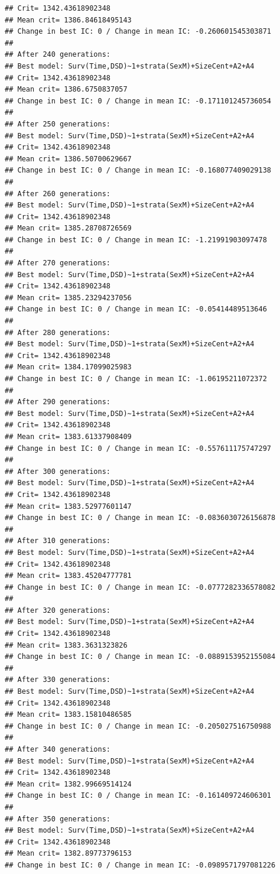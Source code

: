 \documentclass{article}\usepackage[]{graphicx}\usepackage[]{color}
\makeatletter
\newenvironment{kframe}{%
 \def\at@end@of@kframe{}%
 \ifinner\ifhmode%
  \def\at@end@of@kframe{\end{minipage}}%
  \begin{minipage}{\columnwidth}%
 \fi\fi%
 \def\FrameCommand##1{\hskip\@totalleftmargin \hskip-\fboxsep
 \colorbox{shadecolor}{##1}\hskip-\fboxsep
     \hskip-\linewidth \hskip-\@totalleftmargin \hskip\columnwidth}%
 \MakeFramed {\advance\hsize-\width
   \@totalleftmargin\z@ \linewidth\hsize
   \@setminipage}}%
 {\par\unskip\endMakeFramed%
 \at@end@of@kframe}
\newenvironment{knitrout}{}{} %
\makeatother
\begin{document}
\begin{knitrout}
\begin{kframe}
\begin{verbatim}
## Crit= 1342.43618902348
## Mean crit= 1386.84618495143
## Change in best IC: 0 / Change in mean IC: -0.260601545303871
## 
## After 240 generations:
## Best model: Surv(Time,DSD)~1+strata(SexM)+SizeCent+A2+A4
## Crit= 1342.43618902348
## Mean crit= 1386.6750837057
## Change in best IC: 0 / Change in mean IC: -0.171101245736054
## 
## After 250 generations:
## Best model: Surv(Time,DSD)~1+strata(SexM)+SizeCent+A2+A4
## Crit= 1342.43618902348
## Mean crit= 1386.50700629667
## Change in best IC: 0 / Change in mean IC: -0.168077409029138
## 
## After 260 generations:
## Best model: Surv(Time,DSD)~1+strata(SexM)+SizeCent+A2+A4
## Crit= 1342.43618902348
## Mean crit= 1385.28708726569
## Change in best IC: 0 / Change in mean IC: -1.21991903097478
## 
## After 270 generations:
## Best model: Surv(Time,DSD)~1+strata(SexM)+SizeCent+A2+A4
## Crit= 1342.43618902348
## Mean crit= 1385.23294237056
## Change in best IC: 0 / Change in mean IC: -0.05414489513646
## 
## After 280 generations:
## Best model: Surv(Time,DSD)~1+strata(SexM)+SizeCent+A2+A4
## Crit= 1342.43618902348
## Mean crit= 1384.17099025983
## Change in best IC: 0 / Change in mean IC: -1.06195211072372
## 
## After 290 generations:
## Best model: Surv(Time,DSD)~1+strata(SexM)+SizeCent+A2+A4
## Crit= 1342.43618902348
## Mean crit= 1383.61337908409
## Change in best IC: 0 / Change in mean IC: -0.557611175747297
## 
## After 300 generations:
## Best model: Surv(Time,DSD)~1+strata(SexM)+SizeCent+A2+A4
## Crit= 1342.43618902348
## Mean crit= 1383.52977601147
## Change in best IC: 0 / Change in mean IC: -0.0836030726156878
## 
## After 310 generations:
## Best model: Surv(Time,DSD)~1+strata(SexM)+SizeCent+A2+A4
## Crit= 1342.43618902348
## Mean crit= 1383.45204777781
## Change in best IC: 0 / Change in mean IC: -0.0777282336578082
## 
## After 320 generations:
## Best model: Surv(Time,DSD)~1+strata(SexM)+SizeCent+A2+A4
## Crit= 1342.43618902348
## Mean crit= 1383.3631323826
## Change in best IC: 0 / Change in mean IC: -0.0889153952155084
## 
## After 330 generations:
## Best model: Surv(Time,DSD)~1+strata(SexM)+SizeCent+A2+A4
## Crit= 1342.43618902348
## Mean crit= 1383.15810486585
## Change in best IC: 0 / Change in mean IC: -0.205027516750988
## 
## After 340 generations:
## Best model: Surv(Time,DSD)~1+strata(SexM)+SizeCent+A2+A4
## Crit= 1342.43618902348
## Mean crit= 1382.99669514124
## Change in best IC: 0 / Change in mean IC: -0.161409724606301
## 
## After 350 generations:
## Best model: Surv(Time,DSD)~1+strata(SexM)+SizeCent+A2+A4
## Crit= 1342.43618902348
## Mean crit= 1382.89773796153
## Change in best IC: 0 / Change in mean IC: -0.0989571797081226

\end{verbatim}
\end{kframe}
\end{knitrout}
\end{document}
